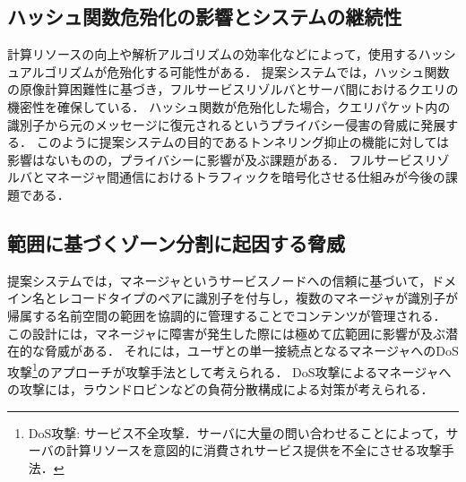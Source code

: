 \subsection{ハッシュ関数危殆化の影響とシステムの継続性}
計算リソースの向上や解析アルゴリズムの効率化などによって，使用するハッシュアルゴリズムが危殆化する可能性がある．
提案システムでは，ハッシュ関数の原像計算困難性に基づき，フルサービスリゾルバとサーバ間におけるクエリの機密性を確保している．
ハッシュ関数が危殆化した場合，クエリパケット内の識別子から元のメッセージに復元されるというプライバシー侵害の脅威に発展する．
このように提案システムの目的であるトンネリング抑止の機能に対しては影響はないものの，プライバシーに影響が及ぶ課題がある．
フルサービスリゾルバとマネージャ間通信におけるトラフィックを暗号化させる仕組みが今後の課題である．


\subsection{範囲に基づくゾーン分割に起因する脅威}
提案システムでは，マネージャというサービスノードへの信頼に基づいて，ドメイン名とレコードタイプのペアに識別子を付与し，複数のマネージャが識別子が帰属する名前空間の範囲を協調的に管理することでコンテンツが管理される．
この設計には，マネージャに障害が発生した際には極めて広範囲に影響が及ぶ潜在的な脅威がある．
それには，ユーザとの単一接続点となるマネージャへのDoS攻撃\footnote{DoS攻撃: サービス不全攻撃．サーバに大量の問い合わせることによって，サーバの計算リソースを意図的に消費されサービス提供を不全にさせる攻撃手法．}のアプローチが攻撃手法として考えられる．
DoS攻撃によるマネージャへの攻撃には，ラウンドロビンなどの負荷分散構成による対策が考えられる．


